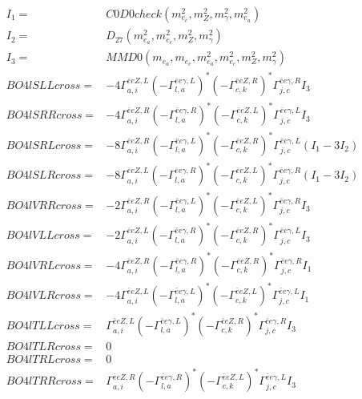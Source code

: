 \documentclass[A4,landscape]{article}
\begin{document}
\begin{align} 
I_1 = & C0D0check(m^2_{e_{{c}}}, m^2_{Z}, m^2_{\gamma}, m^2_{e_{{a}}}) \\ 
I_2 = & D_{27}(m^2_{e_{{a}}}, m^2_{e_{{c}}}, m^2_{Z}, m^2_{\gamma}) \\ 
I_3 = & MMD0(m_{e_{{a}}}, m_{e_{{c}}}, m^2_{e_{{a}}}, m^2_{e_{{c}}}, m^2_{Z}, m^2_{\gamma}) \\ 
  BO4lSLLcross= & -4  \Gamma^{\bar{e}e Z ,L}_{a, i} (- \Gamma^{\bar{e}e \gamma ,L} _{l, a})^* (- \Gamma^{\bar{e}e Z ,R} _{c, k})^* \Gamma^{\bar{e}e \gamma ,R}_{j, c} I_3 \\ 
  BO4lSRRcross= & -4  \Gamma^{\bar{e}e Z ,R}_{a, i} (- \Gamma^{\bar{e}e \gamma ,R} _{l, a})^* (- \Gamma^{\bar{e}e Z ,L} _{c, k})^* \Gamma^{\bar{e}e \gamma ,L}_{j, c} I_3 \\ 
  BO4lSRLcross= & -8  \Gamma^{\bar{e}e Z ,R}_{a, i} (- \Gamma^{\bar{e}e \gamma ,L} _{l, a})^* (- \Gamma^{\bar{e}e Z ,R} _{c, k})^* \Gamma^{\bar{e}e \gamma ,L}_{j, c} (I_1 - 3 I_2) \\ 
  BO4lSLRcross= & -8  \Gamma^{\bar{e}e Z ,L}_{a, i} (- \Gamma^{\bar{e}e \gamma ,R} _{l, a})^* (- \Gamma^{\bar{e}e Z ,L} _{c, k})^* \Gamma^{\bar{e}e \gamma ,R}_{j, c} (I_1 - 3 I_2) \\ 
  BO4lVRRcross= & -2  \Gamma^{\bar{e}e Z ,R}_{a, i} (- \Gamma^{\bar{e}e \gamma ,L} _{l, a})^* (- \Gamma^{\bar{e}e Z ,L} _{c, k})^* \Gamma^{\bar{e}e \gamma ,R}_{j, c} I_3 \\ 
  BO4lVLLcross= & -2  \Gamma^{\bar{e}e Z ,L}_{a, i} (- \Gamma^{\bar{e}e \gamma ,R} _{l, a})^* (- \Gamma^{\bar{e}e Z ,R} _{c, k})^* \Gamma^{\bar{e}e \gamma ,L}_{j, c} I_3 \\ 
  BO4lVRLcross= & -4  \Gamma^{\bar{e}e Z ,R}_{a, i} (- \Gamma^{\bar{e}e \gamma ,R} _{l, a})^* (- \Gamma^{\bar{e}e Z ,R} _{c, k})^* \Gamma^{\bar{e}e \gamma ,R}_{j, c} I_1 \\ 
  BO4lVLRcross= & -4  \Gamma^{\bar{e}e Z ,L}_{a, i} (- \Gamma^{\bar{e}e \gamma ,L} _{l, a})^* (- \Gamma^{\bar{e}e Z ,L} _{c, k})^* \Gamma^{\bar{e}e \gamma ,L}_{j, c} I_1 \\ 
  BO4lTLLcross= &  \Gamma^{\bar{e}e Z ,L}_{a, i} (- \Gamma^{\bar{e}e \gamma ,L} _{l, a})^* (- \Gamma^{\bar{e}e Z ,R} _{c, k})^* \Gamma^{\bar{e}e \gamma ,R}_{j, c} I_3 \\ 
  BO4lTLRcross= & 0 \\ 
  BO4lTRLcross= & 0 \\ 
  BO4lTRRcross= &  \Gamma^{\bar{e}e Z ,R}_{a, i} (- \Gamma^{\bar{e}e \gamma ,R} _{l, a})^* (- \Gamma^{\bar{e}e Z ,L} _{c, k})^* \Gamma^{\bar{e}e \gamma ,L}_{j, c} I_3 \\ 
\end{align} 
\end{document}
